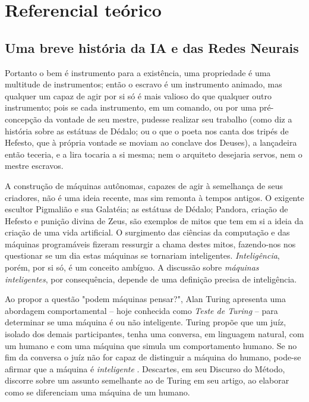 \documentclass[12pt, a4paper]{article}
\begin{document}
\section{Referencial teórico}
\subsection{Uma breve história da IA e das Redes Neurais}
\begin{displayquote}
Portanto o bem é instrumento para a existência, uma propriedade é uma multitude de instrumentos; então o escravo é um instrumento animado,
mas qualquer um capaz de agir por si só é mais valioso do que qualquer outro instrumento; pois se cada instrumento, em um comando,
ou por uma pré-concepção da vontade de seu mestre, pudesse realizar seu trabalho (como diz a história sobre as estátuas de Dédalo; ou o que
o poeta nos canta dos tripés de Hefesto, que à própria vontade se moviam ao conclave dos Deuses), a lançadeira então teceria, e a lira
tocaria a si mesma; nem o arquiteto desejaria servos, nem o mestre escravos. \cite{aristotle_politics}
\end{displayquote}

A construção de máquinas autônomas, capazes de agir à semelhança de seus criadores, não é uma ideia recente, mas sim remonta à tempos antigos. 
O exigente escultor Pigmalião e sua Galatéia; as estátuas de Dédalo; Pandora, criação de Hefesto e punição divina de Zeus, 
são exemplos de mitos que tem em si a ideia da criação de uma vida artificial. 
O surgimento das ciências da computação e das máquinas programáveis fizeram ressurgir a chama destes mitos, 
fazendo-nos nos questionar se um dia estas máquinas se tornariam inteligentes. \emph{Inteligência}, porém, por si só, é um conceito ambíguo.
A discussão sobre \emph{máquinas inteligentes}, por consequência, depende de uma definição precisa de inteligência.

Ao propor a questão "podem máquinas pensar?", Alan Turing apresenta uma abordagem comportamental -- hoje conhecida como \emph{Teste de Turing} --
para determinar se uma máquina é ou não inteligente. Turing propõe que um juíz, isolado dos demais participantes,
tenha uma conversa, em linguagem natural, com um humano e com uma máquina que simula um comportamento humano.
Se no fim da conversa o juíz não for capaz de distinguir a máquina do humano, pode-se afirmar que a máquina é \emph{inteligente}
\cite{turing}. Descartes, em seu Discurso do Método, discorre sobre um assunto semelhante ao de Turing em seu artigo, ao elaborar como se diferenciam
uma máquina de um humano.
\end{document}
